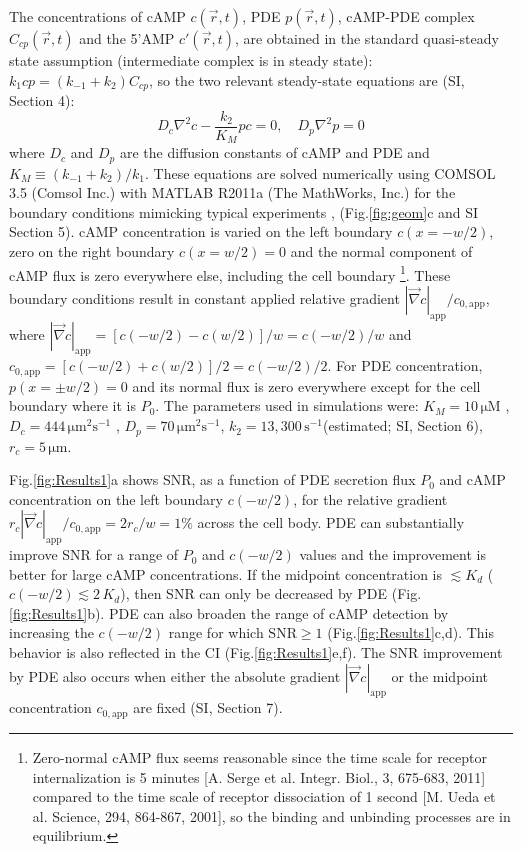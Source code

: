 \documentclass[%
 reprint,
 amsmath,amssymb,
 aps,prl,
 showpacs,
 linenumbers
]{revtex4-1}
\begin{document}
The concentrations of cAMP $c(\vec{r},t)$, PDE $p(\vec{r},t)$, cAMP-PDE complex
$C_{cp}(\vec{r},t)$ and the 5'AMP $c'(\vec{r},t)$, are obtained in the standard quasi-steady
state assumption \cite{QSSA} (intermediate complex is in steady state): $k_{1}cp=(k_{-1}+k_{2})C_{cp}$, so the two relevant steady-state equations are (SI, Section 4):
\begin{equation}
		D_c\nabla^{2}c-\frac{k_2}{K_M}pc = 0, \quad
		D_p\nabla^{2}p = 0
  \label{eq:main_sys}
\end{equation}
where $D_c$ and $D_p$ are the diffusion constants of cAMP and PDE and $K_M \equiv (k_{-1}+k_2)/k_1$. 
These equations are solved numerically using COMSOL 3.5 (Comsol Inc.) with MATLAB R2011a (The MathWorks, Inc.) for the boundary conditions mimicking typical experiments \cite{me,varnumsollStatic,fisherStatic}, (Fig.\ref{fig:geom}c and SI Section 5). 
cAMP concentration is varied on the left boundary $c(x{=}{-}w/2)$, zero on the right boundary $c(x{=}w/2) = 0$ and the normal component of cAMP flux is zero everywhere else, including the cell boundary \footnote{Zero-normal cAMP flux seems reasonable since the time scale for receptor internalization is 5 minutes [A. Serge et al. Integr. Biol., 3, 675-683, 2011] compared to the time scale of receptor dissociation of 1 second [M. Ueda et al. Science, 294, 864-867, 2001], so the binding and unbinding processes are in equilibrium.}. These boundary conditions result in constant applied relative gradient $|\vec{\nabla}c|_{\mathrm{app}}/c_{0,\mathrm{app}}$, where $|\vec{\nabla}c|_{\mathrm{app}} = [c(-w/2) - c(w/2)]/w = c(-w/2)/w$ and $c_{0,\mathrm{app}} = [c(-w/2) + c(w/2)]/2 = c(-w/2)/2$. 
For PDE concentration, $p(x{=}\pm w/2) = 0$ and its normal flux is zero everywhere except for the cell boundary where it is $P_0$.
The parameters used in simulations were: $K_M=10\,\mathrm{\mu M}$ \cite{KmcAMPPDEandPDI}, $D_{c}=444\,\mathrm{\mu m^{2}s^{-1}}$ \cite{DcAMP}, $D_{p}=70\,\mathrm{\mu m^{2}s^{-1}}$, $k_{2}=13,300\,\mathrm{s^{-1}}$(estimated; SI, Section 6), $r_c = 5\, \mathrm{\mu m}$. 

Fig.\ref{fig:Results1}a shows SNR, as a function of PDE secretion flux $P_0$ and cAMP concentration on the left boundary $c(-w/2)$, for the relative gradient $r_c|\vec{\nabla} c|_{\mathrm{app}}/c_{0,\mathrm{app}} = 2r_c/w = 1 \%$ across the cell body. 
PDE can substantially improve SNR for a range of $P_0$ and $c(-w/2)$ values and the improvement is better for large cAMP concentrations. If the midpoint concentration is $\lesssim K_d$ ($c(-w/2) \lesssim 2\, K_d$), then SNR can only be decreased by PDE (Fig.\ref{fig:Results1}b). PDE can also broaden the range of cAMP detection by increasing the $c(-w/2)$ range for which $\mathrm{SNR} \geq 1$ (Fig.\ref{fig:Results1}c,d). This behavior is also reflected in the CI (Fig.\ref{fig:Results1}e,f). The SNR improvement by PDE also occurs when either the absolute gradient $|\vec{\nabla}c|_{\mathrm{app}}$ or the midpoint concentration $c_{0,\mathrm{app}}$ are fixed (SI, Section 7).
\end{document}
